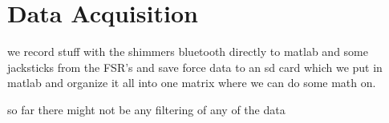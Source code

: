 \section{Data Acquisition}


we record stuff with the shimmers bluetooth directly to matlab and some jacksticks from the FSR's and save force data to an sd card which we put in matlab and organize it all into one matrix where we can do some math on. 

so far there might not be any filtering of any of the data